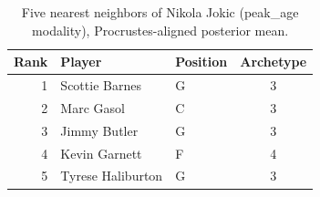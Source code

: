 \begin{table}[htbp]
  \centering\small
  \begin{tabular}{rllc}
    \toprule
    Rank & Player & Position & Archetype \\
    \midrule
    1 & Scottie Barnes & G & 3 \\
    2 & Marc Gasol & C & 3 \\
    3 & Jimmy Butler & G & 3 \\
    4 & Kevin Garnett & F & 4 \\
    5 & Tyrese Haliburton & G & 3 \\
    \bottomrule
  \end{tabular}
  \caption{Five nearest neighbors of Nikola Jokic (peak_age modality), Procrustes-aligned posterior mean.}
  \label{tab:Nikola_Jokic_neighbors_peak_age}
\end{table}

